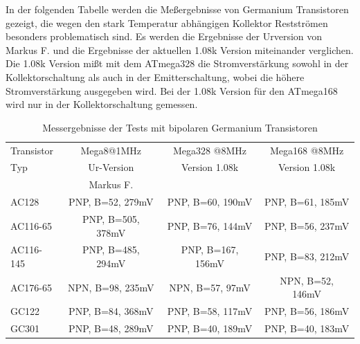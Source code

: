 In der folgenden Tabelle werden die Meßergebnisse von Germanium Transistoren gezeigt, die wegen den
stark Temperatur abhängigen Kollektor Restströmen besonders problematisch sind.
Es werden die Ergebnisse der Urversion von Markus F. und die Ergebnisse der aktuellen 1.08k Version
miteinander verglichen. Die 1.08k Version mißt mit dem ATmega328 die Stromverstärkung sowohl in der
Kollektorschaltung als auch in der Emitterschaltung, wobei die höhere Stromverstärkung ausgegeben wird.
Bei der 1.08k Version für den ATmega168 wird nur in der Kollektorschaltung gemessen.

\begin{table}[H]
  \begin{center}
    \begin{tabular}{| l | c | c | c |}
    \hline
 Transistor & Mega8@1MHz          & Mega328 @8MHz       & Mega168 @8MHz    \\
    Typ     & Ur-Version          & Version 1.08k       & Version 1.08k  \\
            & Markus F.           &                     &        \\
    \hline
    \hline
AC128       & PNP, B=52, 279mV    & PNP, B=60, 190mV     & PNP, B=61, 185mV  \\
    \hline
AC116-65    & PNP, B=505, 378mV   & PNP, B=76, 144mV    & PNP, B=56, 237mV  \\
    \hline
AC116-145   & PNP, B=485, 294mV   & PNP, B=167, 156mV   & PNP, B=83, 212mV \\
    \hline
AC176-65    & NPN, B=98, 235mV    & NPN, B=57, 97mV     & NPN, B=52, 146mV \\
    \hline
GC122       & PNP, B=84, 368mV    & PNP, B=58, 117mV    & PNP, B=56, 186mV \\
    \hline
GC301       & PNP, B=48, 289mV    & PNP, B=40, 189mV    & PNP, B=40, 183mV \\
    \hline
    \end{tabular}
  \end{center}
  \caption{Messergebnisse der Tests mit bipolaren Germanium Transistoren}
  \label{tab:germanium} 
\end{table}

